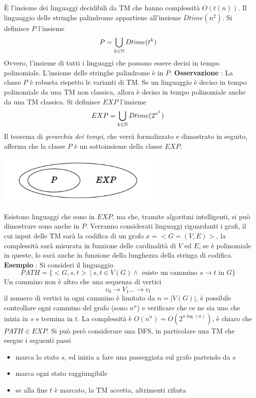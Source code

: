 \documentclass[10pt, letterpaper]{report}
\begin{document}
È l'insieme dei linguaggi decidibili da TM che hanno complessità $O(t(n))$. Il linguaggio delle stringhe palindrome appartiene all'insieme $Dtime(n^2)$.\acc 
{} Si definisce $P$ l'insieme 
$$ P=\bigcup_{k\in {\mathbb N}}Dtime(t^k)$$
Ovvero, l'insieme di tutti i linguaggi che possono essere decisi in tempo polinomiale. L'insieme delle stringhe palindrome è in $P$. \acc 
\textbf{Osservazione} : La classe $P$ è robusta rispetto le varianti di TM. Se un linguaggio è deciso in tempo polinomiale da una TM non classica, allora è deciso in tempo polinomiale anche da una TM classica.\acc 
{} Si definisce $EXP$ l'insieme 
$$ EXP=\bigcup_{k\in {\mathbb N}}Dtime(2^{n^k})$$
Il teorema di \textit{gerarchia dei tempi}, che verrà formalizzato e dimostrato in seguito, afferma che la classe $P$ è un sottoinsieme della classe $EXP$.\begin{center}
    \includegraphics[width=0.6\textwidth ]{images/EXP.pdf}
\end{center}
Esistono linguaggi che sono in $EXP$, ma che, tramite algoritmi intelligenti, si può dimostrare sono anche in $P$. Verranno considerati linguaggi riguardanti i grafi, il cui input delle TM sarà la codifica di un grafo $x=<G=(V,E)>$, la complessità sarà misurata in funzione delle cardinalità di $V$ ed $E$, se è polinomiale in queste, lo sarà anche in funzione della lunghezza della stringa di codifica.\acc 
\textbf{Esempio} : Si consideri il linguaggio 
$$ PATH = \{<G,s,t> \ | \ s,t\in V(G) \land \text{ esiste un cammino }s\rightarrow t\text{ in }G\}$$
Un cammino non è altro che una sequenza di vertici $$v_0\rightarrow V_1 \dots \rightarrow v_l$$ il numero di vertici in ogni cammino è limitato da $n=|V(G)|$, è possibile controllare ogni cammino  del grafo (sono $n^n$) e verificare che ce ne sia uno che inizia in $s$ e termina in $t$. La complessità è $O(n^n)=O(2^{n\log(n)})$, è chiaro che $PATH\in EXP$.\acc 
Si può però considerare una DFS, in particolare una TM che esegue i seguenti passi\begin{itemize}
    \item marca lo stato $s$, ed inizia a fare una passeggiata sul grafo partendo da $s$
    \item marca ogni stato raggiungibile 
    \item se alla fine $t$ è marcato, la TM accetta, altrimenti rifiuta\hfill 
\end{itemize}
\end{document}
